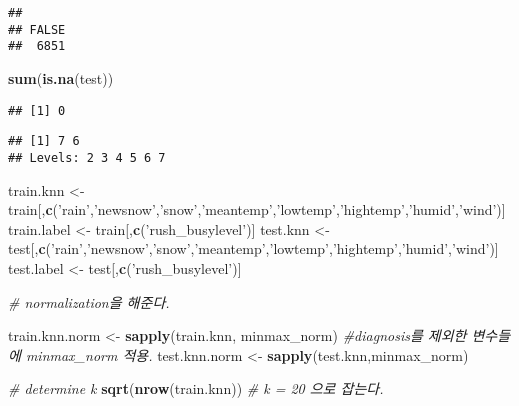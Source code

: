 \documentclass[]{article}
\newenvironment{Shaded}{\begin{snugshade}}{\end{snugshade}}
\newcommand{\KeywordTok}[1]{\textcolor[rgb]{0.13,0.29,0.53}{\textbf{#1}}}
\newcommand{\StringTok}[1]{\textcolor[rgb]{0.31,0.60,0.02}{#1}}
\newcommand{\CommentTok}[1]{\textcolor[rgb]{0.56,0.35,0.01}{\textit{#1}}}
\newcommand{\OperatorTok}[1]{\textcolor[rgb]{0.81,0.36,0.00}{\textbf{#1}}}
\newcommand{\NormalTok}[1]{#1}
\begin{document}
\begin{verbatim}
## 
## FALSE 
##  6851
\end{verbatim}

\begin{Shaded}
\begin{Highlighting}[]
\KeywordTok{sum}\NormalTok{(}\KeywordTok{is.na}\NormalTok{(test))}
\end{Highlighting}
\end{Shaded}

\begin{verbatim}
## [1] 0
\end{verbatim}

\begin{Shaded}
\end{Shaded}

\begin{verbatim}
## [1] 7 6
## Levels: 2 3 4 5 6 7
\end{verbatim}

\begin{Shaded}
\begin{Highlighting}[]
\NormalTok{train.knn  <-}\StringTok{  }\NormalTok{train[,}\KeywordTok{c}\NormalTok{(}\StringTok{'rain'}\NormalTok{,}\StringTok{'newsnow'}\NormalTok{,}\StringTok{'snow'}\NormalTok{,}\StringTok{'meantemp'}\NormalTok{,}\StringTok{'lowtemp'}\NormalTok{,}\StringTok{'hightemp'}\NormalTok{,}\StringTok{'humid'}\NormalTok{,}\StringTok{'wind'}\NormalTok{)]}
\NormalTok{train.label <-}\StringTok{ }\NormalTok{train[,}\KeywordTok{c}\NormalTok{(}\StringTok{'rush_busylevel'}\NormalTok{)]}
\NormalTok{test.knn <-}\StringTok{  }\NormalTok{test[,}\KeywordTok{c}\NormalTok{(}\StringTok{'rain'}\NormalTok{,}\StringTok{'newsnow'}\NormalTok{,}\StringTok{'snow'}\NormalTok{,}\StringTok{'meantemp'}\NormalTok{,}\StringTok{'lowtemp'}\NormalTok{,}\StringTok{'hightemp'}\NormalTok{,}\StringTok{'humid'}\NormalTok{,}\StringTok{'wind'}\NormalTok{)]}
\NormalTok{test.label <-}\StringTok{ }\NormalTok{test[,}\KeywordTok{c}\NormalTok{(}\StringTok{'rush_busylevel'}\NormalTok{)]}

\CommentTok{# normalization을 해준다. }

\NormalTok{train.knn.norm <-}\StringTok{ }\KeywordTok{sapply}\NormalTok{(train.knn, minmax_norm) }\CommentTok{#diagnosis를 제외한 변수들에 minmax_norm 적용.}
\NormalTok{test.knn.norm <-}\StringTok{ }\KeywordTok{sapply}\NormalTok{(test.knn,minmax_norm)}


\CommentTok{# determine k}
\KeywordTok{sqrt}\NormalTok{(}\KeywordTok{nrow}\NormalTok{(train.knn)) }\CommentTok{# k = 20 으로 잡는다.}
\end{Highlighting}
\end{Shaded}
\end{document}

